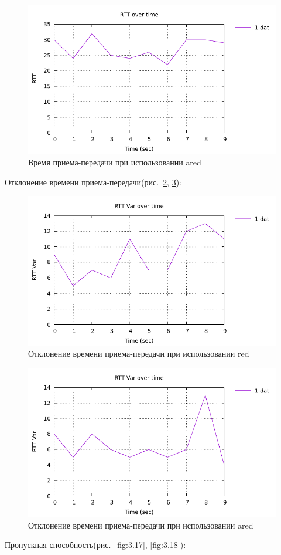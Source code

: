 \begin{figure}[!ht]
  \centering
  \includegraphics[width=0.6\linewidth]{image/mininet_ared/RTT.pdf}
  \caption{Время приема-передачи при использовании ared}
  \label{fig:3.14}
\end{figure}

Отклонение времени приема-передачи(рис.~\ref{fig:3.15}, \ref{fig:3.16}):

\begin{figure}[!ht]
  \centering
  \includegraphics[width=0.6\linewidth]{image/mininet_red/RTT_Var.pdf}
  \caption{Отклонение времени приема-передачи при использовании red}
  \label{fig:3.15}
\end{figure}

\begin{figure}[!ht]
  \centering
  \includegraphics[width=0.6\linewidth]{image/mininet_ared/RTT_Var.pdf}
  \caption{Отклонение времени приема-передачи при использовании ared}
  \label{fig:3.16}
\end{figure}

Пропускная способность(рис.~\ref{fig:3.17}, \ref{fig:3.18}):

